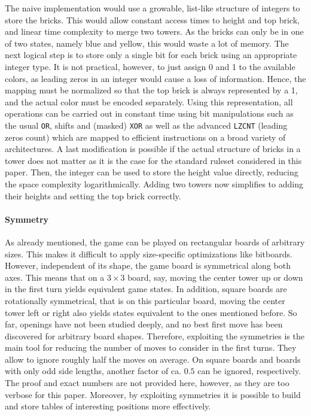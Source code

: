 \documentclass[sigconf]{acmart}
\begin{document}
The naive implementation would use a growable, list-like structure of integers to store the bricks.
This would allow constant access times to height and top brick, and linear time complexity to merge two towers.
As the bricks can only be in one of two states, namely blue and yellow, this would waste a lot of memory.
The next logical step is to store only a single bit for each brick using an appropriate integer type.
It is not practical, however, to just assign 0 and 1 to the available colors, as leading zeros in an integer would cause a loss of information.
Hence, the mapping must be normalized so that the top brick is always represented by a 1, and the actual color must be encoded separately.
Using this representation, all operations can be carried out in constant time using bit manipulations such as the usual \texttt{OR}, shifts and (masked) \texttt{XOR} as well as the advanced \texttt{LZCNT} (leading zeros count) which are mapped to efficient instructions on a broad variety of architectures.
A last modification is possible if the actual structure of bricks in a tower does not matter as it is the case for the standard ruleset considered in this paper.
Then, the integer can be used to store the height value directly, reducing the space complexity logarithmically.
Adding two towers now simplifies to adding their heights and setting the top brick correctly.

\paragraph{Symmetry}
As already mentioned, the game can be played on rectangular boards of arbitrary sizes.
This makes it difficult to apply size-specific optimizations like bitboards.
However, independent of its shape, the game board is symmetrical along both axes.
This means that on a $3\times3$ board, say, moving the center tower up or down in the first turn yields equivalent game states.
In addition, square boards are rotationally symmetrical, that is on this particular board, moving the center tower left or right also yields states equivalent to the ones mentioned before.
So far, openings have not been studied deeply, and no best first move has been discovered for arbitrary board shapes.
Therefore, exploiting the symmetries is the main tool for reducing the number of moves to consider in the first turns.
They allow to ignore roughly half the moves on average.
On square boards and boards with only odd side lengths, another factor of ca. $0.5$ can be ignored, respectively.
The proof and exact numbers are not provided here, however, as they are too verbose for this paper.
Moreover, by exploiting symmetries it is possible to build and store tables of interesting positions more effectively.
\end{document}
